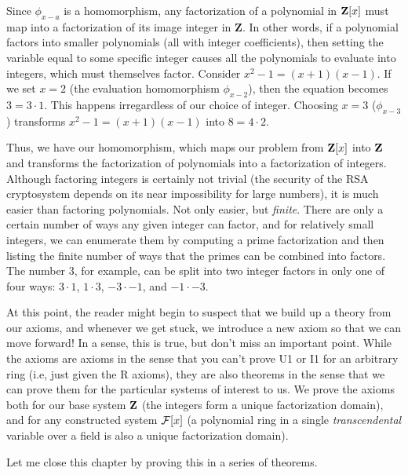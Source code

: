 Since $\phi_{x-a}$ is a homomorphism, any factorization of a
polynomial in ${\bf Z}[x]$ must map into a factorization of its image
integer in {\bf Z}.  In other words, if a polynomial factors into
smaller polynomials (all with integer coefficients), then setting the
variable equal to some specific integer causes all the polynomials to
evaluate into integers, which must themselves factor.  Consider
$x^2-1=(x+1)(x-1)$.  If we set $x=2$ (the evaluation homomorphism
$\phi_{x-2}$), then the equation becomes $3=3\cdot1$.  This happens
irregardless of our choice of integer.  Choosing $x=3$ ($\phi_{x-3}$)
transforms $x^2-1=(x+1)(x-1)$ into $8=4\cdot2$.

Thus, we have our homomorphism, which maps our problem from ${\bf
Z}[x]$ into ${\bf Z}$ and transforms the factorization of polynomials
into a factorization of integers.  Although factoring integers is
certainly not trivial (the security of the RSA cryptosystem depends on
its near impossibility for large numbers), it is much easier than
factoring polynomials.  Not only easier, but {\it finite}.  There are
only a certain number of ways any given integer can factor, and for
relatively small integers, we can enumerate them by computing a prime
factorization and then listing the finite number of ways that the
primes can be combined into factors.  The number $3$, for example, can
be split into two integer factors in only one of four ways: $3\cdot1$,
$1\cdot3$, $-3\cdot-1$, and $-1\cdot-3$.


At this point, the reader might begin to suspect that we build up a
theory from our axioms, and whenever we get stuck, we introduce a new
axiom so that we can move forward!  In a sense, this is true, but
don't miss an important point.  While the axioms are axioms in the
sense that you can't prove U1 or I1 for an arbitrary ring (i.e, just
given the R axioms), they are also theorems in the sense that we can
prove them for the particular systems of interest to us.  We prove the
axioms both for our base system ${\bf Z}$ (the integers form a unique
factorization domain), and for any constructed system ${\cal F}[x]$ (a
polynomial ring in a single {\it transcendental} variable over a field
is also a unique factorization domain).

Let me close this chapter by proving this in a series of theorems.
